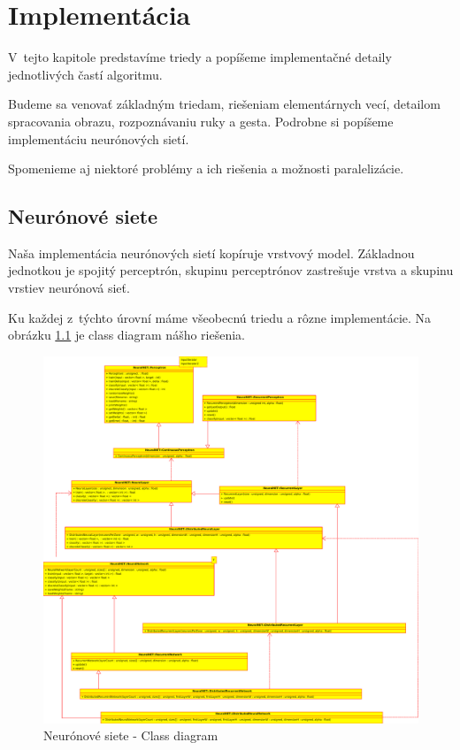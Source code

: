 \chapter{Implementácia}
\label{chap:implementation}

V~tejto kapitole predstavíme triedy a popíšeme implementačné detaily jednotlivých častí algoritmu.

Budeme sa venovať základným triedam, riešeniam elementárnych vecí, detailom spracovania obrazu, rozpoznávaniu ruky a gesta. Podrobne si popíšeme implementáciu neurónových sietí.

Spomenieme aj niektoré problémy a ich riešenia a možnosti paralelizácie.

\bigskip

\section{Neurónové siete}

Naša implementácia neurónových sietí kopíruje vrstvový model. Základnou jednotkou je spojitý perceptrón, skupinu perceptrónov zastrešuje vrstva a skupinu vrstiev neurónová sieť. 

Ku každej z~týchto úrovní máme všeobecnú triedu a rôzne implementácie. Na obrázku \ref{fig:nnclsdiag} je class diagram nášho riešenia.

\begin{figure}[htp]
    \centering
    \includegraphics[width=\textwidth]{images/nn_class_diagram}
    \caption{Neurónové siete - Class diagram}
    \label{fig:nnclsdiag}
\end{figure}

